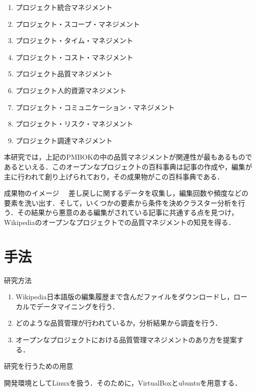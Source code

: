 \begin{enumerate}
 \item プロジェクト統合マネジメント
 \item プロジェクト・スコープ・マネジメント
 \item プロジェクト・タイム・マネジメント
 \item プロジェクト・コスト・マネジメント
 \item プロジェクト品質マネジメント
 \item プロジェクト人的資源マネジメント
 \item プロジェクト・コミュニケーション・マネジメント
 \item プロジェクト・リスク・マネジメント
 \item プロジェクト調達マネジメント
\end{enumerate}








本研究では，上記のPMBOKの中の品質マネジメントが関連性が最もあるものであるといえる．このオープンなプロジェクトの百科事典は記事の作成や，編集が主に行われて創り上げられており，その成果物がこの百科事典である．


成果物のイメージ
　差し戻しに関するデータを収集し，編集回数や頻度などの要素を洗い出す．そして，いくつかの要素から条件を決めクラスター分析を行う．その結果から悪意のある編集がされている記事に共通する点を見つけ，Wikipediaのオープンなプロジェクトでの品質マネジメントの知見を得る．




\chapter{手法}

研究方法

\begin{enumerate}
 \item Wikipedia日本語版の編集履歴まで含んだファイルをダウンロードし，ローカルでデータマイニングを行う．
 \item どのような品質管理が行われているか，分析結果から調査を行う．
 \item オープンなプロジェクトにおける品質管理マネジメントのあり方を提案する．
\end{enumerate}

研究を行うための用意

開発環境としてLinuxを扱う．そのために，VirtualBoxとubuntuを用意する． 



